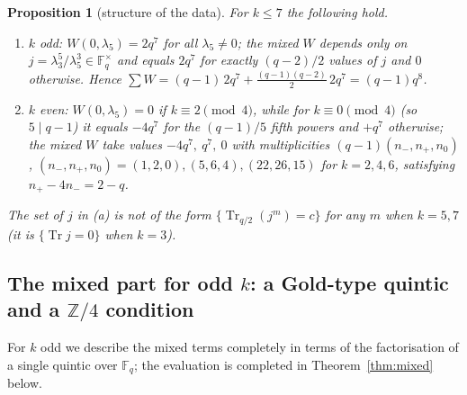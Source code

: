 \documentclass[11pt,a4paper]{amsart}
\newtheorem{proposition}[theorem]{Proposition}
\theoremstyle{definition}
\newcommand{\F}{\mathbb{F}}
\newcommand{\Z}{\mathbb{Z}}
\newcommand{\Tr}{\operatorname{Tr}}
\begin{document}
\begin{proposition}[structure of the data]\label{prop:pattern}
For $k\le7$ the following hold.
\begin{enumerate}[label=\textup{(\alph*)},leftmargin=2em]
\item $k$ odd: $W(0,\lambda_5)=2q^7$ for all $\lambda_5\ne0$; the mixed $W$ depends only on $j=\lambda_3^5/\lambda_5^3\in\F_q^\times$ and equals $2q^7$ for exactly $(q-2)/2$ values of $j$ and $0$ otherwise. Hence $\sum W=(q-1)\,2q^7+\frac{(q-1)(q-2)}2\,2q^7=(q-1)q^8$.
\item $k$ even: $W(0,\lambda_5)=0$ if $k\equiv2\pmod4$, while for $k\equiv0\pmod4$ (so $5\mid q-1$) it equals $-4q^7$ for the $(q-1)/5$ fifth powers and $+q^7$ otherwise; the mixed $W$ take values $-4q^7,\ q^7,\ 0$ with multiplicities $(q-1)(n_-,n_+,n_0)$, $(n_-,n_+,n_0)=(1,2,0),(5,6,4),(22,26,15)$ for $k=2,4,6$, satisfying $n_+-4n_-=2-q$.
\end{enumerate}
The set of $j$ in (a) is not of the form $\{\Tr_{q/2}(j^m)=c\}$ for any $m$ when $k=5,7$ (it is $\{\Tr j=0\}$ when $k=3$).
\end{proposition}

\subsection{The mixed part for odd \texorpdfstring{$k$}{k}: a Gold-type quintic and a \texorpdfstring{$\Z/4$}{Z/4} condition}
For $k$ odd we describe the mixed terms completely in terms of the factorisation of a single quintic over $\F_q$; the evaluation is completed in Theorem~\ref{thm:mixed} below.
\end{document}
